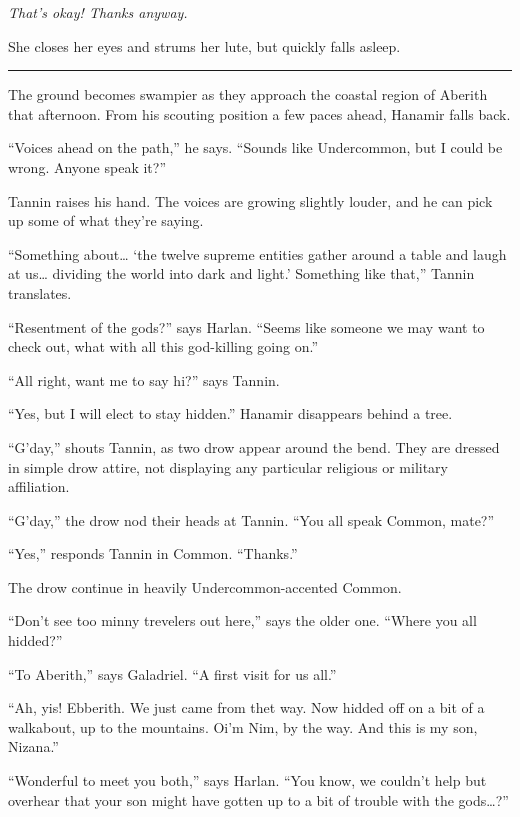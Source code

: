 \documentclass[smalldemyvopaper,11pt,twoside,onecolumn,openright,extrafontsizes]{memoir}
\begin{document}
\emph{That's okay! Thanks anyway.}

She closes her eyes and strums her lute, but quickly falls asleep.

\begin{center}\rule{0.5\linewidth}{\linethickness}\end{center}

The ground becomes swampier as they approach the coastal region of
Aberith that afternoon. From his scouting position a few paces ahead,
Hanamir falls back.

``Voices ahead on the path,'' he says. ``Sounds like Undercommon, but I
could be wrong. Anyone speak it?''

Tannin raises his hand. The voices are growing slightly louder, and he
can pick up some of what they're saying.

``Something about\ldots{} `the twelve supreme entities gather around a
table and laugh at us\ldots{} dividing the world into dark and light.'
Something like that,'' Tannin translates.

``Resentment of the gods?'' says Harlan. ``Seems like someone we may
want to check out, what with all this god-killing going on.''

``All right, want me to say hi?'' says Tannin.

``Yes, but I will elect to stay hidden.'' Hanamir disappears behind a
tree.

``G'day,'' shouts Tannin, as two drow appear around the bend. They are
dressed in simple drow attire, not displaying any particular religious
or military affiliation.

``G'day,'' the drow nod their heads at Tannin. ``You all speak Common,
mate?''

``Yes,'' responds Tannin in Common. ``Thanks.''

The drow continue in heavily Undercommon-accented Common.

``Don't see too minny trevelers out here,'' says the older one. ``Where
you all hidded?''

``To Aberith,'' says Galadriel. ``A first visit for us all.''

``Ah, yis! Ebberith. We just came from thet way. Now hidded off on a bit
of a walkabout, up to the mountains. Oi'm Nim, by the way. And this is
my son, Nizana.''

``Wonderful to meet you both,'' says Harlan. ``You know, we couldn't
help but overhear that your son might have gotten up to a bit of trouble
with the gods\ldots?''
\end{document}
